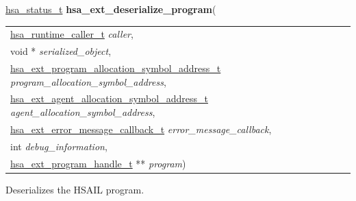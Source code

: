 \documentclass[final]{book}
\newcommand{\hsaarg}[1]{\textit{#1}}
\begin{document}
\noindent\begin{tcolorbox}[breakable,nobeforeafter,colframe=white,colback=lightgray,left=0mm]
\hyperlink{group__status_1gad755322e7ff95456520e8abdbe90d225}{hsa_status_t} \hypertarget{group__HsailLinkerServiceLayer_1ga30bf1671d42e07d8e07d7ea60f44f4b7}{\textbf{hsa_ext_deserialize_program}}(
\vspace{-3.5mm}\begin{longtable}{@{}p{\textwidth}}
\hspace{1.7em}\hyperlink{group__RuntimeCommon_1ga7d9b1191602415f5dd3893985cc93826}{hsa_runtime_caller_t} \hsaarg{caller},\\
\hspace{1.7em}void * \hsaarg{serialized_object},\\
\hspace{1.7em}\hyperlink{group__HsailLinkerServiceLayer_1ga239d0ff41a3902d08da1c082739405a4}{hsa_ext_program_allocation_symbol_address_t} \hsaarg{program_allocation_symbol_address},\\
\hspace{1.7em}\hyperlink{group__HsailLinkerServiceLayer_1ga27a2745cd242e80be6cfceef2990585c}{hsa_ext_agent_allocation_symbol_address_t} \hsaarg{agent_allocation_symbol_address},\\
\hspace{1.7em}\hyperlink{group__FinalizerCoreApi_1gace3d3971c5289675c4f88ce0045db41f}{hsa_ext_error_message_callback_t} \hsaarg{error_message_callback},\\
\hspace{1.7em}int \hsaarg{debug_information},\\
\hspace{1.7em}\hyperlink{group__HsailLinkerServiceLayer_1gaea8d90863414407ddba7e318db7412f9}{hsa_ext_program_handle_t} ** \hsaarg{program})\end{longtable}

\end{tcolorbox}
Deserializes the HSAIL program.
\end{document}
